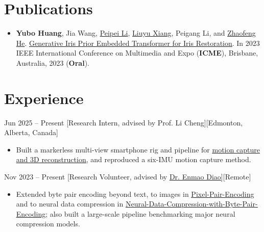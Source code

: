\documentclass{chicv}
\begin{document}
\section{Publications}

\begin{itemize}
  \item \textbf{Yubo Huang}, Jia Wang, \href{https://teacher.bupt.edu.cn/lipeipei/en/index/241243/list/index.htm}{Peipei Li}, \href{https://teacher.bupt.edu.cn/xiangliuyu/en/lwcg/255396/list/index.htm}{Liuyu Xiang}, Peigang Li, and \href{https://teacher.bupt.edu.cn/hezhaofeng/en/lwcg/206617/list/index.htm}{Zhaofeng He}. \href{https://scholar.google.ca/scholar?q=Generative+Iris+Prior+Embedded+Transformer+for+Iris+Restoration.&hl=en&as_sdt=0&as_vis=1&oi=scholart}{\uline{Generative Iris Prior Embedded Transformer for Iris Restoration}}. In 2023 IEEE International Conference on Multimedia and Expo (\textbf{ICME}), Brisbane, Australia, 2023 (\textbf{Oral}).
\end{itemize}

\section{Experience}

  {Jun 2025 -- Present}
  [Research Intern, advised by Prof. Li Cheng][Edmonton, Alberta, Canada]
  \begin{itemize}
    \item Built a markerless multi-view smartphone rig and pipeline for \href{https://yubohuangai.github.io/motion-capture}{\underline{motion capture and 3D reconstruction}}, and reproduced a six-IMU motion capture method.
  \end{itemize}

  {Nov 2023 -- Present}
  [Research Volunteer, advised by \href{https://diaoenmao.com/}{\underline{Dr. Enmao Diao}}][Remote]
  \begin{itemize}
    \item Extended byte pair encoding beyond text, to images in \href{https://gitlab.com/huangyubo/Pixel-Pair-Encoding}{\underline{Pixel-Pair-Encoding}} and to neural data compression in \href{https://gitlab.com/huangyubo/Neural-Data-Compression-with-Byte-Pair-Encoding}{\underline{Neural-Data-Compression-with-Byte-Pair-Encoding}}; also built a large-scale pipeline benchmarking major neural compression models.
  \end{itemize}
\end{document}
